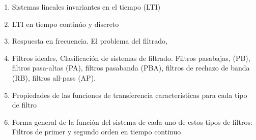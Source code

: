 \begin{enumerate}
 \item Sistemas lineales invariantes en el tiempo (LTI)
 \item  LTI en tiempo continúo y discreto
 \item  Respuesta en frecuencia. El problema del filtrado,  
 \item Filtros ideales, Clasificación de sistemas de filtrado. Filtros pasabajas, (PB), filtros pasa-altas (PA), filtros pasabanda (PBA), filtros de rechazo de banda (RB), filtros all-pass (AP).
 \item Propiedades de las funciones de transferencia características para cada tipo de filtro
 \item Forma general de la función del sistema de cada uno de estos tipos de filtros: Filtros de primer y segundo orden en tiempo continuo
\end{enumerate}
